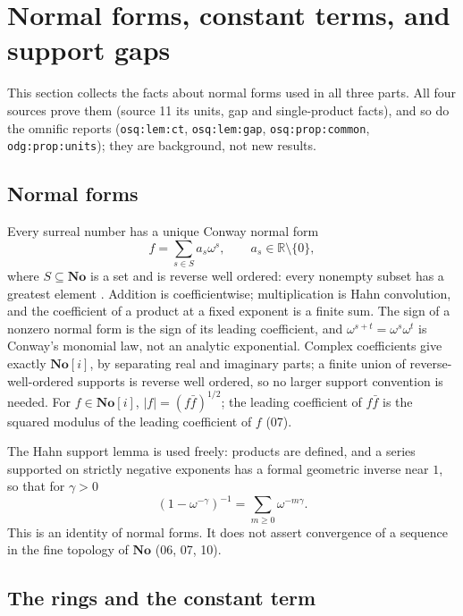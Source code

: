 \documentclass[11pt,oneside]{article}
\numberwithin{equation}{section}
\theoremstyle{definition}
\theoremstyle{remark}
\newcommand{\No}{\mathbf{No}}
\newcommand{\SC}{\No[i]}
\newcommand{\R}{\mathbb R}
\newcommand{\replabel}[1]{\nolinkurl{#1}}
\begin{document}
\section{Normal forms, constant terms, and support gaps}\label{ogl:sec:background}

This section collects the facts about normal forms used in all three parts.
All four sources prove them (source 11 its units, gap and single-product
facts), and so do the omnific reports
(\replabel{osq:lem:ct}, \replabel{osq:lem:gap}, \replabel{osq:prop:common},
\replabel{odg:prop:units}); they are background, not new results.

\subsection{Normal forms}\label{ogl:sub:normalforms}

Every surreal number has a unique Conway normal form
\begin{equation}\label{ogl:eq:nf}
 f=\sum_{s\in S}a_s\omega^s,\qquad a_s\in\R\setminus\{0\},
\end{equation}
where $S\subseteq\No$ is a set and is reverse well ordered: every nonempty
subset has a greatest element \cite{Conway,Gonshor,Berarducci}. Addition is
coefficientwise; multiplication is Hahn convolution, and the coefficient of a
product at a fixed exponent is a finite sum. The sign of a nonzero normal form is
the sign of its leading coefficient, and $\omega^{s+t}=\omega^s\omega^t$ is
Conway's monomial law, not an analytic exponential. Complex coefficients give
exactly $\SC$, by separating real and imaginary parts; a finite union of
reverse-well-ordered supports is reverse well ordered, so no larger support
convention is needed. For $f\in\SC$, $|f|=(f\bar f)^{1/2}$; the leading
coefficient of $f\bar f$ is the squared modulus of the leading coefficient of
$f$ (07).

The Hahn support lemma is used freely: products are defined, and a series
supported on strictly negative exponents has a formal geometric inverse near
$1$, so that for $\gamma>0$
\begin{equation}\label{ogl:eq:geom}
 (1-\omega^{-\gamma})^{-1}=\sum_{m\ge0}\omega^{-m\gamma}.
\end{equation}
This is an identity of normal forms. It does not assert convergence of a
sequence in the fine topology of $\No$ (06, 07, 10).

\subsection{The rings and the constant term}\label{ogl:sub:rings}
\end{document}
